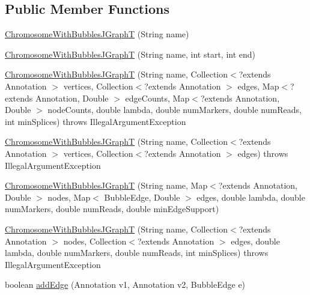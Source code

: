 \subsection*{Public Member Functions}
\begin{DoxyCompactItemize}
\item 
\hyperlink{classbroad_1_1pda_1_1seq_1_1graph_1_1_chromosome_with_bubbles_j_graph_t_aac13df74ce52fd9243d7f79b623cb314}{Chromosome\+With\+Bubbles\+J\+Graph\+T} (String name)
\item 
\hyperlink{classbroad_1_1pda_1_1seq_1_1graph_1_1_chromosome_with_bubbles_j_graph_t_aefd5f83d05ffd142b010826ea8903199}{Chromosome\+With\+Bubbles\+J\+Graph\+T} (String name, int start, int end)
\item 
\hyperlink{classbroad_1_1pda_1_1seq_1_1graph_1_1_chromosome_with_bubbles_j_graph_t_a16943b77a60f60314c4347bec8dbc694}{Chromosome\+With\+Bubbles\+J\+Graph\+T} (String name, Collection$<$?extends Annotation $>$ vertices, Collection$<$?extends Annotation $>$ edges, Map$<$?extends Annotation, Double $>$ edge\+Counts, Map$<$?extends Annotation, Double $>$ node\+Counts, double lambda, double num\+Markers, double num\+Reads, int min\+Splices)  throws Illegal\+Argument\+Exception
\item 
\hyperlink{classbroad_1_1pda_1_1seq_1_1graph_1_1_chromosome_with_bubbles_j_graph_t_ab87ded96fed48f813431f3b2922478c6}{Chromosome\+With\+Bubbles\+J\+Graph\+T} (String name, Collection$<$?extends Annotation $>$ vertices, Collection$<$?extends Annotation $>$ edges)  throws Illegal\+Argument\+Exception
\item 
\hyperlink{classbroad_1_1pda_1_1seq_1_1graph_1_1_chromosome_with_bubbles_j_graph_t_a4bf2c00686aabf592c26ded4e0da3c0d}{Chromosome\+With\+Bubbles\+J\+Graph\+T} (String name, Map$<$?extends Annotation, Double $>$ nodes, Map$<$ Bubble\+Edge, Double $>$ edges, double lambda, double num\+Markers, double num\+Reads, double min\+Edge\+Support)
\item 
\hyperlink{classbroad_1_1pda_1_1seq_1_1graph_1_1_chromosome_with_bubbles_j_graph_t_a5f6e3d0b7ac0edf67e8e3c7ac622f339}{Chromosome\+With\+Bubbles\+J\+Graph\+T} (String name, Collection$<$?extends Annotation $>$ nodes, Collection$<$?extends Annotation $>$ edges, double lambda, double num\+Markers, double num\+Reads, int min\+Splices)  throws Illegal\+Argument\+Exception
\item 
boolean \hyperlink{classbroad_1_1pda_1_1seq_1_1graph_1_1_chromosome_with_bubbles_j_graph_t_a75dcac62d0b06c6297961055eae8e38a}{add\+Edge} (Annotation v1, Annotation v2, Bubble\+Edge e)

\end{DoxyCompactItemize}
